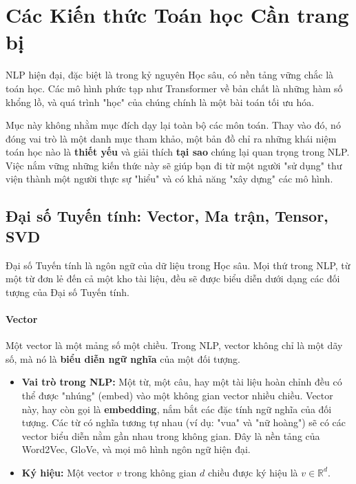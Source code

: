 
\section{Các Kiến thức Toán học Cần trang bị}
\label{sec:kien_thuc_toan_hoc}

NLP hiện đại, đặc biệt là trong kỷ nguyên Học sâu, có nền tảng vững chắc là toán học. Các mô hình phức tạp như Transformer về bản chất là những hàm số khổng lồ, và quá trình "học" của chúng chính là một bài toán tối ưu hóa.

Mục này không nhằm mục đích dạy lại toàn bộ các môn toán. Thay vào đó, nó đóng vai trò là một danh mục tham khảo, một bản đồ chỉ ra những khái niệm toán học nào là \textbf{thiết yếu} và giải thích \textbf{tại sao} chúng lại quan trọng trong NLP. Việc nắm vững những kiến thức này sẽ giúp bạn đi từ một người "sử dụng" thư viện thành một người thực sự "hiểu" và có khả năng "xây dựng" các mô hình.

\subsection{Đại số Tuyến tính: Vector, Ma trận, Tensor, SVD}
\label{ssec:dai_so_tuyen_tinh}
Đại số Tuyến tính là ngôn ngữ của dữ liệu trong Học sâu. Mọi thứ trong NLP, từ một từ đơn lẻ đến cả một kho tài liệu, đều sẽ được biểu diễn dưới dạng các đối tượng của Đại số Tuyến tính.

\paragraph{Vector}
Một vector là một mảng số một chiều. Trong NLP, vector không chỉ là một dãy số, mà nó là \textbf{biểu diễn ngữ nghĩa} của một đối tượng.
\begin{itemize}
    \item \textbf{Vai trò trong NLP:} Một từ, một câu, hay một tài liệu hoàn chỉnh đều có thể được "nhúng" (embed) vào một không gian vector nhiều chiều. Vector này, hay còn gọi là \textbf{embedding}, nắm bắt các đặc tính ngữ nghĩa của đối tượng. Các từ có nghĩa tương tự nhau (ví dụ: "vua" và "nữ hoàng") sẽ có các vector biểu diễn nằm gần nhau trong không gian. Đây là nền tảng của Word2Vec, GloVe, và mọi mô hình ngôn ngữ hiện đại.
    \item \textbf{Ký hiệu:} Một vector $v$ trong không gian $d$ chiều được ký hiệu là $v \in \mathbb{R}^d$.
\end{itemize}

